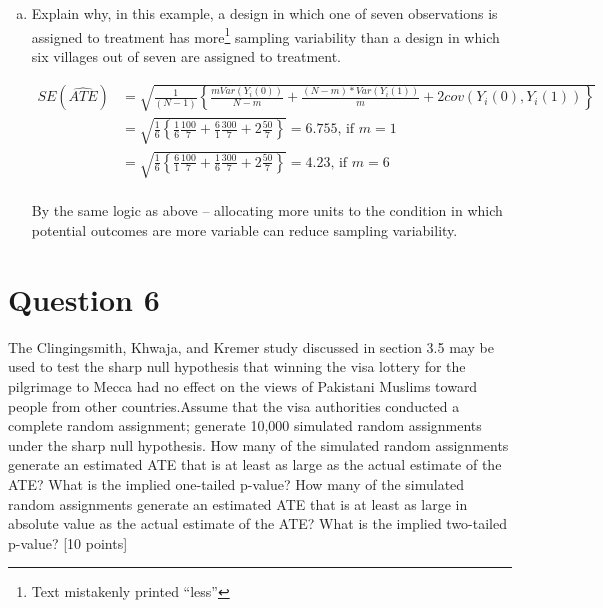 \documentclass[11pt,notitlepage]{article}\usepackage[]{graphicx}\usepackage[]{color}
\begin{document}
\begin{enumerate}[a)]
\item Explain why, in this example, a design in which one of seven observations is assigned to treatment has more\footnote{Text mistakenly printed ``less''} sampling variability than a design in which six villages out of seven are assigned to treatment.  

\begin{align*}
SE(\widehat{ATE}) &= \sqrt{\frac{1}{(N-1)} \left \{ \frac{mVar(Y_i (0))}{N- m} + \frac{(N-m)*Var(Y_i (1))}{m} + 2cov(Y_i(0), Y_i(1))\right \}} \\
&= \sqrt{\frac{1}{6} \left \{ \frac{1}{6}\frac{100}{7} + \frac{6}{1}\frac{300}{7} + 2\frac{50}{7}\right \}} = 6.755 \text{, if $m = 1$} \\
&= \sqrt{\frac{1}{6} \left \{ \frac{6}{1}\frac{100}{7} + \frac{1}{6}\frac{300}{7} + 2\frac{50}{7}\right \}} = 4.23 \text{, if $m = 6$} \\
\end{align*}

By the same logic as above -- allocating more units to the condition in which potential outcomes are more variable can reduce sampling variability.

\end{enumerate}

\section*{Question 6}
The Clingingsmith, Khwaja, and Kremer study discussed in section 3.5 may be used to test the sharp null hypothesis that winning the visa lottery for the pilgrimage to Mecca had no effect on the views of Pakistani Muslims toward people from other countries.Assume that the visa authorities conducted a complete random assignment; generate 10,000 simulated random assignments under the sharp null hypothesis.  How many of the simulated random assignments generate an estimated ATE that is at least as large as the actual estimate of the ATE? What is the implied one-tailed p-value? How many of the simulated random assignments generate an estimated ATE that is at least as large in absolute value as the actual estimate of the ATE? What is the implied two-tailed p-value? [10 points]
\end{document}
